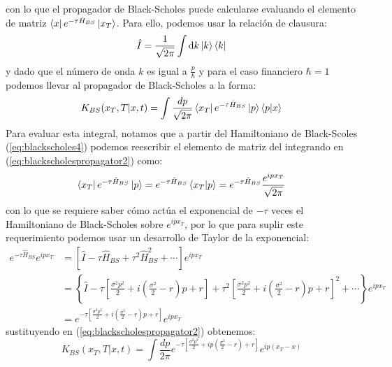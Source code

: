 \documentclass[11pt,a4paper]{article}
\begin{document}
con lo que el propagador de Black-Scholes puede calcularse evaluando el elemento de matriz $\bra{x}e^{-\tau \hat{H}_{BS}}\ket{x_T}$. Para ello, podemos usar la relaci\'on de clausura:
\begin{equation}
\hat{I} = \frac{1}{\sqrt{2\pi}}\int \mathrm{d}k \ket{k}\bra{k}
\label{eq:kclosurerelation}
\end{equation}
y dado que el n\'umero de onda $k$ es igual a $\frac{p}{\hbar}$ y para el caso financiero $\hbar = 1$ podemos llevar al propagador de Black-Scholes a la forma:
\begin{equation}
K_{BS}(x_T,T|x,t) = \int \frac{dp}{\sqrt{2\pi}}\bra{x_T}e^{-\tau \hat{H}_{BS}}\ket{p}\braket{p|x}
\label{eq:blackscholespropagator2}
\end{equation}
Para evaluar esta integral, notamos que a partir del Hamiltoniano de Black-Scoles (\ref{eq:blackscholes4}) podemos reescribir el elemento de matriz del integrando en (\ref{eq:blackscholespropagator2}) como:
\begin{equation}
\bra{x_T}e^{-\tau \hat{H}_{BS}}\ket{p} = e^{-\tau \hat{H}_{BS}}\braket{x_T|p} = e^{-\tau \hat{H}_{BS}}\frac{e^{ipx_T}}{\sqrt{2\pi}}
\label{eq:blackscholespropagator3}
\end{equation}
con lo que se requiere saber c\'omo act\'ua el exponencial de $-\tau$ veces el Hamiltoniano de Black-Scholes sobre $e^{ipx_T}$, por lo que para suplir este requerimiento podemos usar un desarrollo de Taylor de la exponencial:
\begin{equation}
\begin{split}
e^{-\tau \hat{H}_{BS}}e^{ipx_T} & = \left[ \hat{I} - \tau \hat{H}_{BS} + \tau^2 \hat{H}_{BS}^2 + \cdots \right]e^{ipx_T} \\
&  = \left\{ \hat{I} - \tau \left[ \frac{\sigma^2 p^2}{2}  + i\left( \frac{\sigma^2 }{2} - r \right)p + r \right] + \tau^2 \left[ \frac{\sigma^2 p^2}{2} + i\left( \frac{\sigma^2 }{2} - r \right)p + r \right]^2 + \cdots \right\} e^{ipx_T} \\
& = e^{- \tau \left[ \frac{\sigma^2 p^2}{2}  + i\left( \frac{\sigma^2 }{2} - r \right)p + r \right]}e^{ipx_T}
\end{split}
\label{eq:blackscholespropagator4}
\end{equation}
sustituyendo en (\ref{eq:blackscholespropagator2}) obtenemos:
\begin{equation}
K_{BS}(x_T,T|x,t) = \int \frac{dp}{2\pi}e^{- \tau \left[ \frac{\sigma^2 p^2}{2}  + ip\left( \frac{\sigma^2 }{2} - r \right) + r \right]}e^{ip(x_T - x)}
\label{eq:blackscholespropagator5}
\end{equation}
\end{document}
